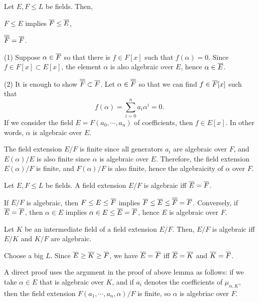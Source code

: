 \documentclass{../exp}
\begin{document}
\begin{lem}
Let $E,F\le L$ be fields.
Then,
\begin{cond}
\item $F\le E$ implies $\overline F\le \overline E$,
\item $\overline{\overline F}=\overline F$.
\end{cond}
\begin{pf}
(1)
Suppose $\alpha\in\overline F$ so that there is $f\in F[x]$ such that $f(\alpha)=0$.
Since $f\in F[x]\subset E[x]$, the element $\alpha$ is also algebraic over $E$, hence $\alpha\in\overline E$.

(2)
It is enough to show $\overline{\overline F}\subset\overline F$.
Let $\alpha\in\overline{\overline F}$ so that we can find $f\in\overline F[x]$ such that
\[f(\alpha)=\sum_{i=0}^na_i\alpha^i=0.\]
If we consider the field $E=F(a_0,\cdots,a_n)$ of coefficients, then $f\in E[x]$.
In other words, $\alpha$ is algebraic over $E$.

The field extension $E/F$ is finite since all generators $a_i$ are algebraic over $F$, and $E(\alpha)/E$ is also finite since $\alpha$ is algebraic over $E$.
Therefore, the field extension $E(\alpha)/F$ is finite, and $F(\alpha)/F$ is also finite, hence the algebraicity of $\alpha$ over $F$.
\end{pf}
\end{lem}

\begin{lem}
Let $E,F\le L$ be fields.
A field extension $E/F$ is algebraic iff $\overline E=\overline F$.
\end{lem}
\begin{pf}
If $E/F$ is algebraic, then $F\le E\le\overline F$ implies $\overline F\le\overline E\le\overline{\overline F}=\overline F$.
Conversely, if $\overline E=\overline F$, then $\alpha\in E$ implies $\alpha\in E\le\overline E=\overline F$, hence $E$ is algebraic over $F$.
\end{pf}

\begin{thm}
Let $K$ be an intermediate field of a field extension $E/F$.
Then, $E/F$ is algebraic iff $E/K$ and $K/F$ are algebraic.
\end{thm}
\begin{pf}[1]
Choose a big $L$.
Since $\overline E\ge\overline K\ge\overline F$, we have $\overline E=\overline F$ iff $\overline E=\overline K$ and $\overline K=\overline F$.
\end{pf}
\begin{pf}[2]
A direct proof uses the argument in the proof of above lemma as follows: if we take $\alpha\in E$ that is algebraic over $K$, and if $a_i$ denotes the coefficients of $\mu_{\alpha,K}$, then the field extension $F(a_1,\cdots,a_n,\alpha)/F$ is finite, so $\alpha$ is algebriac over $F$.
\end{pf}
\end{document}

